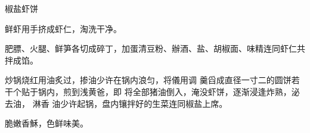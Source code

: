 \begin{recipe}{椒盐虾饼}

\ingredients


\preparation

\step 鲜虾用手挤成虾仁，淘洗干净。

\step 肥膘、火腿、鲜笋各切成碎丁，加蛋清豆粉、辦酒、盐、胡椒面、味精连同虾仁共
拌成馅。

\step 炒锅烧红用油炙过，掺油少许在锅内浪匀，将儀用调 羹舀成直径一寸二的圆饼若
干个贴于锅内，煎到浅黄爸，即 将全部猪油倒入，淹没虾饼，逐渐浸逢炸熟，泌去油，
淋香 油少许起锅，盘内镶拌好的生菜连同椒盐上席。

\features

脆嫩香穌，色鲜味美。

\end{recipe}

